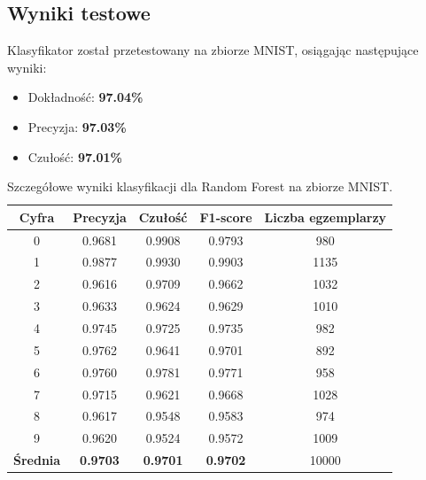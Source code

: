 \documentclass{article}
\begin{document}
\subsection{Wyniki testowe}
Klasyfikator został przetestowany na zbiorze MNIST, osiągając następujące wyniki:
\begin{itemize}
    \item Dokładność: \textbf{97.04\%}
    \item Precyzja: \textbf{97.03\%}
    \item Czułość: \textbf{97.01\%}
\end{itemize}

\begin{table}[H]
\centering
\begin{tabular}{|c|c|c|c|c|}
\hline
\textbf{Cyfra} & \textbf{Precyzja} & \textbf{Czułość} & \textbf{F1-score} & \textbf{Liczba egzemplarzy} \\ \hline
0              & 0.9681            & 0.9908           & 0.9793            & 980                    \\ \hline
1              & 0.9877            & 0.9930           & 0.9903            & 1135                   \\ \hline
2              & 0.9616            & 0.9709           & 0.9662            & 1032                   \\ \hline
3              & 0.9633            & 0.9624           & 0.9629            & 1010                   \\ \hline
4              & 0.9745            & 0.9725           & 0.9735            & 982                    \\ \hline
5              & 0.9762            & 0.9641           & 0.9701            & 892                    \\ \hline
6              & 0.9760            & 0.9781           & 0.9771            & 958                    \\ \hline
7              & 0.9715            & 0.9621           & 0.9668            & 1028                   \\ \hline
8              & 0.9617            & 0.9548           & 0.9583            & 974                    \\ \hline
9              & 0.9620            & 0.9524           & 0.9572            & 1009                   \\ \hline
\textbf{Średnia}  & \textbf{0.9703}   & \textbf{0.9701}  & \textbf{0.9702}   & 10000                  \\ \hline
\end{tabular}
\caption{Szczegółowe wyniki klasyfikacji dla Random Forest na zbiorze MNIST.}
\end{table}
\end{document}
